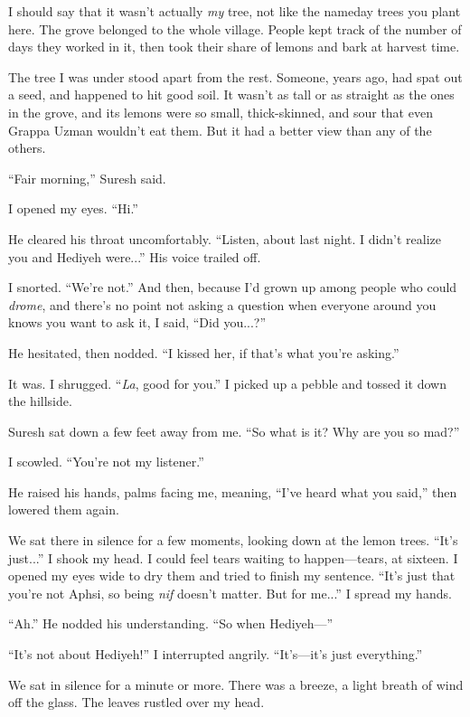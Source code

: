 I should say that it wasn't actually \emph{my} tree, not like the nameday
trees you plant here.  The grove belonged to the whole village.
People kept track of the number of days they worked in it, then took
their share of lemons and bark at harvest time.

The tree I was under stood apart from the rest.  Someone, years ago,
had spat out a seed, and happened to hit good soil.  It wasn't as tall
or as straight as the ones in the grove, and its lemons were so small,
thick-skinned, and sour that even Grappa Uzman wouldn't eat them.  But
it had a better view than any of the others.

``Fair morning,'' Suresh said.

I opened my eyes.  ``Hi.''

He cleared his throat uncomfortably.  ``Listen, about last night.  I
didn't realize you and Hediyeh were...''  His voice trailed off.

I snorted.  ``We're not.''  And then, because I'd grown up among people
who could \emph{drome}, and there's no point not asking a question when
everyone around you knows you want to ask it, I said, ``Did you...?''

He hesitated, then nodded.  ``I kissed her, if that's what you're
asking.''

It was.  I shrugged.  ``\emph{La}, good for you.''  I picked up a pebble and
tossed it down the hillside.

Suresh sat down a few feet away from me.  ``So what is it?  Why are you
so mad?''

I scowled.  ``You're not my listener.''

He raised his hands, palms facing me, meaning, ``I've heard what you
said,'' then lowered them again.

We sat there in silence for a few moments, looking down at the lemon
trees.  ``It's just...''  I shook my head.  I could feel tears waiting
to happen---tears, at sixteen.  I opened my eyes wide to dry them and
tried to finish my sentence.  ``It's just that you're not Aphsi, so
being \emph{nif} doesn't matter.  But for me...''  I spread my hands.

``Ah.''  He nodded his understanding.  ``So when Hediyeh---''

``It's not about Hediyeh!''  I interrupted angrily.  ``It's---it's just
everything.''

We sat in silence for a minute or more.  There was a breeze, a light
breath of wind off the glass.  The leaves rustled over my head.


